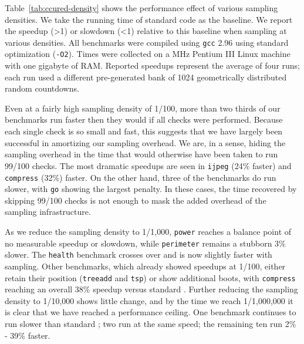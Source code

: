 Table~\ref{tab:ccured-density} shows the performance effect of various
sampling densities.  We take the running time of standard \ccured code
as the baseline.  We report the speedup (>1) or slowdown (<1) relative
to this baseline when sampling at various densities.  All benchmarks
were compiled using \texttt{gcc} 2.96 using standard optimization
(\texttt{-O2}).  Times were collected on a \unknown MHz Pentium III
Linux machine with one gigabyte of RAM.  Reported speedups represent
the average of four runs; each run used a different pre-generated bank
of 1024 geometrically distributed random countdowns.

Even at a fairly high sampling density of 1/100, more than two thirds
of our benchmarks run faster then they would if all checks were
performed.  Because each single check is so small and fast, this
suggests that we have largely been successful in amortizing our
sampling overhead.  We are, in a sense, hiding the sampling overhead
in the time that would otherwise have been taken to run 99/100 checks.
The most dramatic speedups are seen in \texttt{ijpeg} (24\% faster)
and \texttt{compress} (32\%) faster.  On the other hand, three of the
benchmarks do run slower, with \texttt{go} showing the largest
penalty.  In these cases, the time recovered by skipping 99/100 checks
is not enough to mask the added overhead of the sampling
infrastructure.

As we reduce the sampling density to 1/1,000, \texttt{power} reaches a
balance point of no measurable speedup or slowdown, while
\texttt{perimeter} remains a stubborn 3\% slower.  The \texttt{health}
benchmark crosses over and is now slightly faster with sampling.
Other benchmarks, which already showed speedups at 1/100, either
retain their position (\texttt{treeadd} and \texttt{tsp}) or show
additional boots, with \texttt{compress} reaching an overall 38\%
speedup versus standard \ccured.  Further reducing the sampling
density to 1/10,000 shows little change, and by the time we reach
1/1,000,000 it is clear that we have reached a performance ceiling.
One benchmark continues to run slower than standard \ccured; two run
at the same speed; the remaining ten run 2\% - 39\% faster.




